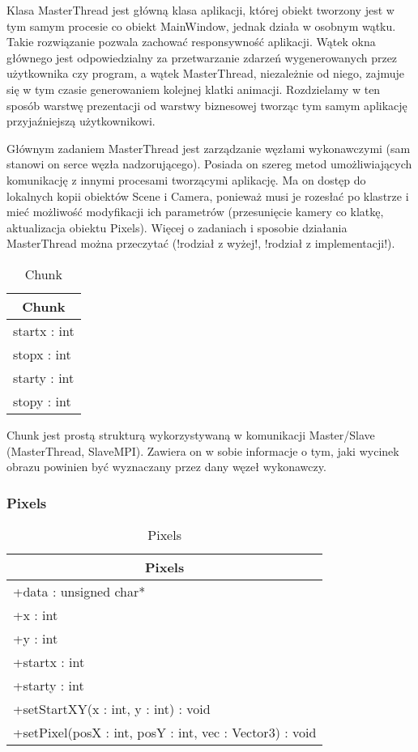 Klasa MasterThread jest główną klasa aplikacji, której obiekt tworzony jest w tym samym procesie co obiekt MainWindow, jednak działa w osobnym wątku. Takie rozwiązanie pozwala zachować responsywność aplikacji. Wątek okna głównego jest odpowiedzialny za przetwarzanie zdarzeń wygenerowanych przez użytkownika czy program, a wątek MasterThread, niezależnie od niego, zajmuje się w tym czasie generowaniem kolejnej klatki animacji. Rozdzielamy w ten sposób warstwę prezentacji od warstwy biznesowej tworząc tym samym aplikację przyjaźniejszą użytkownikowi.

Głównym zadaniem MasterThread jest zarządzanie węzłami wykonawczymi (sam stanowi on serce węzła nadzorującego). Posiada on szereg metod umożliwiających komunikację z innymi procesami tworzącymi aplikację. Ma on dostęp do lokalnych kopii obiektów Scene i Camera, ponieważ musi je rozesłać po klastrze i mieć możliwość modyfikacji ich parametrów (przesunięcie kamery co klatkę, aktualizacja obiektu Pixels). Więcej o zadaniach i sposobie działania MasterThread można przeczytać (!rodział z wyżej!, !rodział z implementacji!).

\footnotesize
\begin{longtable}{|p{14cm}|}
    \caption{Chunk} \label{tab:Chunk (struktura} \\ \hline
    \multicolumn{1}{|c|}{Chunk} \\ \hline
    startx : int \\
    stopx : int \\
    starty : int \\
    stopy : int \\
    \hline
\end{longtable}
\normalsize

Chunk jest prostą strukturą wykorzystywaną w komunikacji Master/Slave (MasterThread, SlaveMPI). Zawiera on w sobie informacje o tym, jaki wycinek obrazu powinien być wyznaczany przez dany węzeł wykonawczy.


\subsubsection{Pixels}

\footnotesize
\begin{longtable}{|p{14cm}|}
    \caption{Pixels} \label{tab:Pixels} \\ \hline
    \multicolumn{1}{|c|}{Pixels} \\ \hline
    +data : unsigned char* \\
    +x : int \\
    +y : int \\ 
    +startx : int \\
    +starty : int \\
    \hline
	+setStartXY(x : int, y : int) : void \\
	+setPixel(posX : int, posY : int, vec : Vector3) : void \\
	\hline
\end{longtable}
\normalsize

